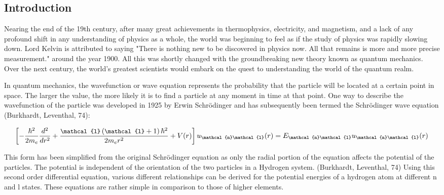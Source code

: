 \documentclass{article}
\begin{document}
\begin{multicols}{2}
\section{Introduction}
Nearing the end of the 19th century, after many great achievements in thermophysics, electricity, and magnetism, and a lack of any profound shift in any understanding of physics as a whole, the world was beginning to feel as if the study of physics was rapidly slowing down. Lord Kelvin is attributed to saying "There is nothing new to be discovered in physics now. All that remains is more and more precise measurement." around the year 1900. All this was shortly changed with the groundbreaking new theory known as quantum mechanics. Over the next century, the world's greatest scientists would embark on the quest to understanding the world of the quantum realm.

In quantum mechanics, the wavefunction or wave equation represents the probability that the particle will be located at a certain point in space. The larger the value, the more likely it is to find a particle at any moment in time at that point. One way to describe the wavefunction of the particle was developed in 1925 by Erwin Schrödinger and has subsequently been termed the Schrödinger wave equation (Burkhardt, Leventhal, 74):

\begin{equation}
    \label{equation1}
    \small{\left[ -\frac{{\hbar}^2}{2m_e} \frac{d^2}{dr^2} + \frac{\mathcal{l} \left(\mathcal{l} + 1\right){\hbar^2}}{2m_er^2} + V(r) \right] u_{\mathcal{n}\mathcal{l}}(r) = E_{\mathcal{n}\mathcal{l}}u_{\mathcal{n}\mathcal{l}}(r)  }
\end{equation}

\vspace{0.1in}

This form has been simplified from the original Schrödinger equation as only the radial portion of the equation affects the potential of the particles. The potential is independent of the orientation of the two particles in a Hydrogen system. (Burkhardt, Leventhal, 74) Using this second order differential equation, various different relationships can be derived for the potential energies of a hydrogen atom at different n and l states. These equations are rather simple in comparison to those of higher elements. 





\end{multicols}
\end{document}
